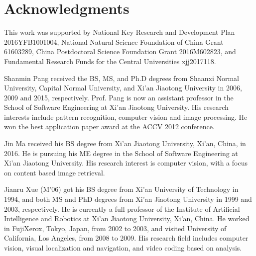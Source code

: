 \documentclass[journal]{IEEEtran}
\begin{document}
\section*{Acknowledgments}
This work was supported by National Key Research and Development Plan 2016YFB1001004,
National Natural Science Foundation of China Grant 61603289, China Postdoctoral
Science Foundation Grant 2016M602823, and Fundamental Research Funds for the Central Universities xjj2017118.


\ifCLASSOPTIONcaptionsoff
  \newpage
\fi









\begin{IEEEbiography}{Shanmin Pang} received the BS, MS, and Ph.D degrees from Shaanxi Normal University, Capital Normal University, and Xi'an Jiaotong University
in 2006, 2009 and 2015, respectively.
Prof. Pang is now an assistant professor in the School of Software Engineering at Xi'an Jiaotong University. His research interests include pattern recognition, computer vision and image processing. He won the best application paper award at the ACCV 2012 conference.
\end{IEEEbiography}

\begin{IEEEbiography}{Jin Ma}
received his BS degree  from Xi'an Jiaotong University, Xi'an, China, in 2016.
He is pursuing his ME degree in the School of Software Engineering at Xi'an Jiaotong University.
His research interest is computer vision, with a focus on content based image retrieval.
\end{IEEEbiography}


\begin{IEEEbiography}{Jianru Xue} (M'06)
got his BS degree from Xi'an University of Technology in 1994, and both MS and PhD degrees from Xi'an Jiaotong University in 1999
and 2003, respectively.
He is currently a full professor of the Institute of Artificial Intelligence and Robotics at Xi'an Jiaotong University, Xi'an,
China. He worked in FujiXerox, Tokyo, Japan, from 2002 to 2003, and visited University
of California, Los Angeles, from 2008 to 2009. His research field includes computer vision, visual localization and navigation, and video
coding based on analysis.
\end{IEEEbiography}
\end{document}
